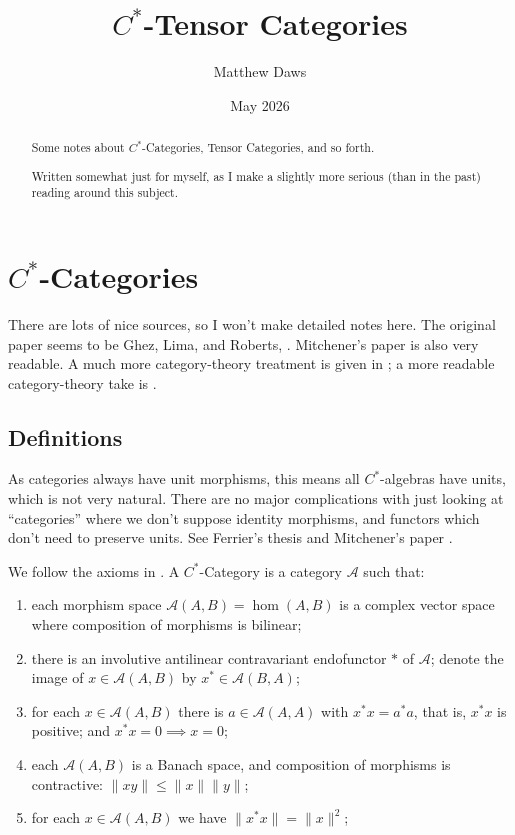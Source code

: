 \documentclass[a4paper,11pt]{article}
\theoremstyle{plain}
\theoremstyle{remark}
\newcommand{\mc}[1]{\mathcal{#1}}
\begin{document}
\title{$C^*$-Tensor Categories}
\author{Matthew Daws}
\date{May 2026}
\maketitle

\begin{abstract}
Some notes about $C^*$-Categories, Tensor Categories, and so forth.

Written somewhat just for myself, as I make a slightly more serious (than in the past) reading around this subject.
\end{abstract}

\tableofcontents

\section{\texorpdfstring{$C^*$}{CStar}-Categories}

There are lots of nice sources, so I won't make detailed notes here.  The original paper seems to be Ghez, Lima, and Roberts, \cite{GLR_Wstar_categories}.  Mitchener's paper \cite{mitchener_cstar_cats} is also very readable.  A much more category-theory treatment is given in \cite{Bunke_NonUnitalCstarCats, bunke2025additiveccategoriesktheory}; a more readable category-theory take is \cite{DellAmbrogio_unitary_monoidal}.


\subsection{Definitions}

As categories always have unit morphisms, this means all $C^*$-algebras have units, which is not very natural.  There are no major complications with just looking at ``categories'' where we don't suppose identity morphisms, and functors which don't need to preserve units.  See Ferrier's thesis \cite{ferrier_thesis} and Mitchener's paper \cite{mitchener_cstar_cats}.

We follow the axioms in \cite{GLR_Wstar_categories}.  A $C^*$-Category is a category $\mc A$ such that:
\begin{enumerate}[(1)]
  \item\label{cstar-cat-axioms:1} each morphism space $\mc A(A,B) = \hom(A,B)$ is a complex vector space where composition of morphisms is bilinear;
  \item\label{cstar-cat-axioms:2} there is an involutive antilinear contravariant endofunctor $*$ of $\mc A$; denote the image of $x\in\mc A(A,B)$ by $x^*\in\mc A(B,A)$;
  \item\label{cstar-cat-axioms:3} for each $x\in\mc A(A,B)$ there is $a\in\mc A(A,A)$ with $x^*x = a^*a$, that is, $x^*x$ is positive; and $x^*x=0\implies x=0$;
  \item\label{cstar-cat-axioms:4} each $\mc A(A,B)$ is a Banach space, and composition of morphisms is contractive: $\|xy\| \leq \|x\| \|y\|$;
  \item\label{cstar-cat-axioms:5} for each $x\in\mc A(A,B)$ we have $\|x^*x\| = \|x\|^2$;
\end{enumerate}
\end{document}
